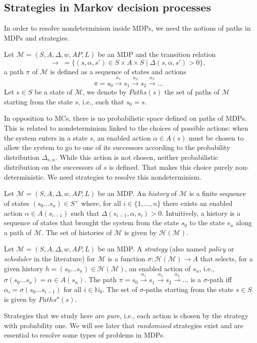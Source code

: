 \subsection{Strategies in Markov decision processes}
In order to resolve nondeterminism inside MDPs, we need the notions of paths in MDPs and strategies.
\begin{definition}
  Let $\mathcal{M}=(S, A, \Delta, w, AP, L)$ be an MDP and the transition relation
  \[\rightarrow \; =  \{ (s, \alpha, s') \in S \times A \times S \; | \; \Delta(s, \alpha, s') > 0 \}, \,\]
	a path $\pi$ of $\mathcal{M}$ is defined as a sequence of states and actions
	\[ \pi = s_0 \xrightarrow{\alpha_1} s_1 \xrightarrow{\alpha_2} s_2 \xrightarrow{\alpha_3} \dots \]
	Let $s \in S$ be a state of $\mathcal{M}$, we denote by $Paths(s)$ the set of
	paths of $\mathcal{M}$ starting from the state $s$, i.e., such that $s_0 = s$.
\end{definition}
In opposition to MCs, there is no probabilistic space defined on paths of MDPs.
This is related to nondeterminism linked to the choices of possible actions:
when the system enters in a state $s$, an enabled action $\alpha \in A(s)$ must be chosen to allow the system to go to one of its successors according to the probability distribution $\Delta_{s, \alpha}$.
While this action is not chosen, neither probabilistic distribution on the successors of $s$ is defined. That makes this choice purely non-deterministic.
We need strategies to resolve this nondeterminism.
\begin{definition}
	Let $\mathcal{M} = (S, A, \Delta, w, AP, L)$ be an MDP. An \textit{history} of $\mathcal{M}$
	is a finite sequence of states $(s_0 \dots s_n) \in S^+$ where, for all
	$i \in \{1, \dots, n \}$ there exists an enabled action $\alpha \in A(s_{i-1})$ such that $\Delta(s_{i-1}, \alpha, s_i) > 0$.
	Intuitively, a history is a sequence of states that brought the system from the state $s_0$ to the state $s_n$ along a path of $\mathcal{M}$. The set of histories of $\mathcal{M}$  is given by $\mathcal{H}(\mathcal{M})$.
\end{definition}

\begin{definition}
Let $\mathcal{M} = (S, A, \Delta, w, AP, L)$ be an MDP. A \textit{strategy} (also named \textit{policy} or \textit{scheduler} in the literature) for $\mathcal{M}$
	is a function
	$\sigma: \mathcal{H}(\mathcal{M}) \rightarrow A$
	that selects, for a given history $h = (s_0 \dots s_n) \in \mathcal{H}(\mathcal{M})$, an enabled action of $s_n$, i.e., $\sigma(s_0 \dots s_n) = \alpha \in A(s_n)$.
	The path $\pi = s_0 \xrightarrow{\alpha_1} s_1 \xrightarrow{\alpha_2} s_2 \xrightarrow{\alpha_3} \dots$
	is a $\sigma$-path iff $\alpha_i = \sigma(s_0 \dots s_{i-1})$
	for all $i \in \mathbb{N}_0$. The set of $\sigma$-paths starting from the state $s \in S$ is given by $Paths^\sigma(s)$.
\end{definition}
Strategies that we study here are \textit{pure}, i.e., each action is chosen by the strategy with probability one. We will see later that \textit{randomised} strategies exist and are essential to resolve some types of problems in MDPs. \\

